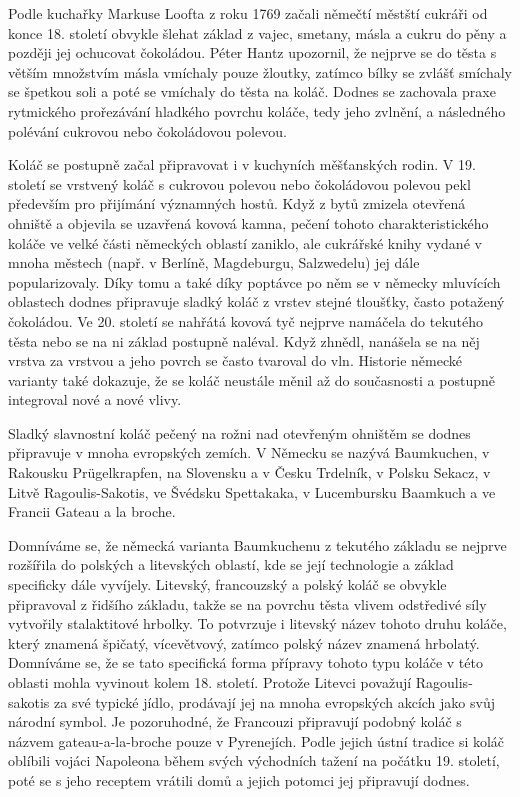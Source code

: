 Podle kuchařky Markuse Loofta z roku 1769 začali němečtí městští cukráři
od konce 18. století obvykle šlehat základ z vajec, smetany, másla a
cukru do pěny a později jej ochucovat čokoládou. Péter Hantz upozornil,
že nejprve se do těsta s větším množstvím másla vmíchaly pouze žloutky,
zatímco bílky se zvlášť smíchaly se špetkou soli a poté se vmíchaly do
těsta na koláč. Dodnes se zachovala praxe rytmického prořezávání
hladkého povrchu koláče, tedy jeho zvlnění, a následného polévání
cukrovou nebo čokoládovou polevou.

Koláč se postupně začal připravovat i v kuchyních měšťanských rodin. V
19. století se vrstvený koláč s cukrovou polevou nebo čokoládovou
polevou pekl především pro přijímání významných hostů. Když z bytů
zmizela otevřená ohniště a objevila se uzavřená kovová kamna, pečení
tohoto charakteristického koláče ve velké části německých oblastí
zaniklo, ale cukrářské knihy vydané v mnoha městech (např. v Berlíně,
Magdeburgu, Salzwedelu) jej dále popularizovaly. Díky tomu a také díky
poptávce po něm se v německy mluvících oblastech dodnes připravuje
sladký koláč z vrstev stejné tloušťky, často potažený čokoládou. Ve 20.
století se nahřátá kovová tyč nejprve namáčela do tekutého těsta nebo se
na ni základ postupně naléval. Když zhnědl, nanášela se na něj vrstva za
vrstvou a jeho povrch se často tvaroval do vln. Historie německé
varianty také dokazuje, že se koláč neustále měnil až do současnosti a
postupně integroval nové a nové vlivy.

Sladký slavnostní koláč pečený na rožni nad otevřeným ohništěm se dodnes
připravuje v mnoha evropských zemích. V Německu se nazývá Baumkuchen, v
Rakousku Prügelkrapfen, na Slovensku a v Česku Trdelník, v Polsku
Sekacz, v Litvě Ragoulis-Sakotis, ve Švédsku Spettakaka, v Lucembursku
Baamkuch a ve Francii Gateau a la broche.

Domníváme se, že německá varianta Baumkuchenu z tekutého základu se
nejprve rozšířila do polských a litevských oblastí, kde se její
technologie a základ specificky dále vyvíjely. Litevský, francouzský a
polský koláč se obvykle připravoval z řidšího základu, takže se na
povrchu těsta vlivem odstředivé síly vytvořily stalaktitové hrbolky. To
potvrzuje i litevský název tohoto druhu koláče, který znamená špičatý,
vícevětvový, zatímco polský název znamená hrbolatý. Domníváme se, že se
tato specifická forma přípravy tohoto typu koláče v této oblasti mohla
vyvinout kolem 18. století. Protože Litevci považují Ragoulis-sakotis za
své typické jídlo, prodávají jej na mnoha evropských akcích jako svůj
národní symbol. Je pozoruhodné, že Francouzi připravují podobný koláč s
názvem gateau-a-la-broche pouze v Pyrenejích. Podle jejich ústní tradice
si koláč oblíbili vojáci Napoleona během svých východních tažení na
počátku 19. století, poté se s jeho receptem vrátili domů a jejich
potomci jej připravují dodnes.

